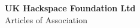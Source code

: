 

\begin{titlepage}
\begin{center}
{\bf \LARGE UK Hackspace Foundation Ltd}\\[36pt]
{\Large Articles of Association}

\vfill

\end{center}
\end{titlepage}


